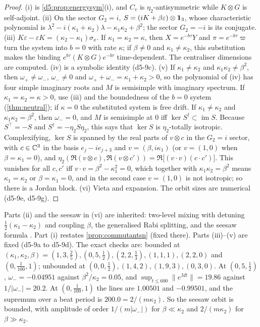 \begin{proof}
(i) is \cref{d5:prop:energysym}(i), and $C_v$ is $\eta_2$-antisymmetric while $K\otimes G$ is self-adjoint. (ii) On the sector $G_2=i$,
$S=(iK+\beta\varepsilon)\otimes\mathbf 1_3$, whose characteristic polynomial is $\lambda^2-i(\kappa_1+\kappa_2)\lambda-\kappa_1\kappa_2+\beta^2$; the sector $G_2=-i$ is
its conjugate. (iii) $K\varepsilon-\varepsilon K=(\kappa_2-\kappa_1)\sigma_x$. If $\kappa_1=\kappa_2=\kappa$, then $X=e^{-b\tau}Y$ and $\pi=e^{-b\tau}\varpi$ turn
the system into $b=0$ with rate $\kappa$; if $\beta\neq0$ and $\kappa_1\neq\kappa_2$, this substitution makes the binding $e^{b\tau}(K\otimes G)e^{-b\tau}$ time-dependent. The
centraliser dimensions are computed. (iv) is a symbolic identity (d5-9c). (v) If $\kappa_1\neq\kappa_2$ and $\kappa_1\kappa_2\neq\beta^2$, then $\omega_+\neq\omega_-$,
$\omega_-\neq0$ and $\omega_++\omega_-=\kappa_1+\kappa_2>0$, so the polynomial of (iv) has four simple imaginary roots and $M$ is semisimple with imaginary
spectrum. If $\kappa_1=\kappa_2=\kappa>0$, use (iii) and the boundedness of the $b=0$ system (\cref{thm:neutral}); if $\kappa=0$ the substituted
system is free drift. If $\kappa_1\neq\kappa_2$ and $\kappa_1\kappa_2=\beta^2$, then $\omega_-=0$, and $M$ is semisimple at $0$ iff $\ker S^\dagger\subset\operatorname{im}S$.
Because $S^{\!\top}=-S$ and $S^\dagger=-\eta_2S\eta_2$, this says that $\ker S$ is $\eta_2$-totally isotropic. Complexifying, $\ker S$ is spanned by
the real parts of $v\otimes c$ in the $G_2=i$ sector, with $c\in\mathbb{C}^3$ in the basis $e_j-ie_{j+3}$ and $v=(\beta,i\kappa_1)$ (or $v=(1,0)$ when $\beta=\kappa_1=0$), and
$\eta_2(\Re(v\otimes c),\Re(v\otimes c'))=\Re\bigl[(v\cdot v)(c\cdot c')\bigr]$. This vanishes for all $c,c'$ iff $v\cdot v=\beta^2-\kappa_1^2=0$, which together
with $\kappa_1\kappa_2=\beta^2$ means $\kappa_1=\kappa_2$ or $\beta=\kappa_1=0$, and in the second case $v=(1,0)$ is not isotropic; so there is a Jordan block.
(vi) Vieta and expansion. The orbit sizes are numerical (d5-9e, d5-9g).
\end{proof}

Parts (ii) and the seesaw in (vi) are inherited: two-level mixing with detuning $\tfrac12(\kappa_1-\kappa_2)$ and coupling $\beta$, the generalised Rabi
splitting, and the seesaw formula \cite{Minkowski77}. Part (i) restates \cref{prop:commutantsn} (fixed there). Parts (iii)--(v) are fixed
(d5-9a to d5-9d). The exact checks are: bounded at $(\kappa_1,\kappa_2,\beta)=(1,3,\tfrac25),(0,5,\tfrac12),(2,2,\tfrac13),(1,1,1),(2,2,0)$ and
$(0,\tfrac1{100},1)$; unbounded at $(0,0,\tfrac12),(1,4,2),(1,9,3),(0,3,0)$. At $(0,5,\tfrac12)$, $\omega_-=-0.04951$ against $\beta^2/\kappa_2=0.05$, and
$\sup_{t\le600}\|e^{Mt}\|=19.86$ against $1/|\omega_-|=20.2$. At $(0,\tfrac1{100},1)$ the lines are $1.00501$ and $-0.99501$, and the supremum over a beat
period is $200.0=2/(m\kappa_2)$. So the seesaw orbit is bounded, with amplitude of order $1/(m|\omega_-|)$ for $\beta\ll\kappa_2$ and $2/(m\kappa_2)$ for
$\beta\gg\kappa_2$.


